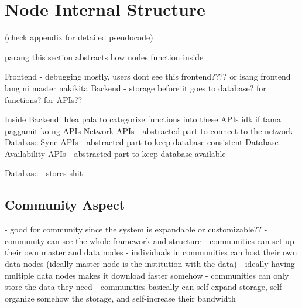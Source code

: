 \documentclass[acmsmall]{acmart}
\begin{document}
\section{Node Internal Structure}
(check appendix for detailed pseudocode)

parang this section abstracts how nodes function inside

Frontend - debugging mostly, users dont see this frontend???? or isang frontend lang ni master nakikita
Backend - storage before it goes to database? for functions? for APIs??
 
Inside Backend: Idea pala to categorize functions into these APIs idk if tama paggamit ko ng APIs
Network APIs - abstracted part to connect to the network
Database Sync APIs - abstracted part to keep database consistent
Database Availability APIs - abstracted part to keep database available


Database - stores shit


\subsection{Community Aspect}
- good for community since the system is expandable or customizable??
- community can see the whole framework and structure
- communities can set up their own master and data nodes
- individuals in communities can host their own data nodes (ideally master node is the institution with the data)
- ideally having multiple data nodes makes it download faster somehow
- communities can only store the data they need
- communities basically can self-expand storage, self-organize somehow the storage, and self-increase their bandwidth 
\end{document}
